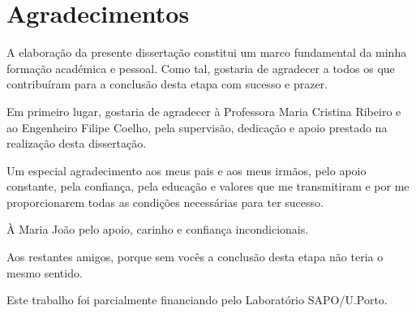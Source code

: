 \chapter*{Agradecimentos}
A elaboração da presente dissertação constitui um marco fundamental da minha formação académica e pessoal. Como tal, gostaria de agradecer a todos os que contribuíram para a conclusão desta etapa com sucesso e prazer.

\vspace{2mm}
Em primeiro lugar, gostaria de agradecer à Professora Maria Cristina Ribeiro e ao Engenheiro Filipe Coelho, pela supervisão, dedicação e apoio prestado na realização desta dissertação.

\vspace{2mm}
Um especial agradecimento aos meus pais e aos meus irmãos, pelo apoio constante, pela confiança, pela educação e valores que me transmitiram e por me proporcionarem todas as condições necessárias para ter sucesso.

\vspace{2mm}
À Maria João pelo apoio, carinho e confiança incondicionais.

\vspace{2mm}
Aos restantes amigos, porque sem vocês a conclusão desta etapa não teria o mesmo sentido.

\vspace{10mm}
Este trabalho foi parcialmente financiando pelo Laboratório SAPO/U.Porto.

